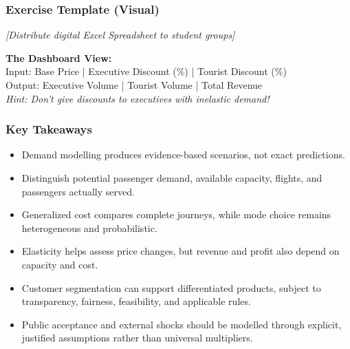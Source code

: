 \documentclass{beamer}
\begin{document}
\begin{frame}[t]
  \frametitle{Exercise Template (Visual)}
  
  \begin{center}
      \textit{[Distribute digital Excel Spreadsheet to student groups]}
      
      \vspace{0.5cm}
      
      \textbf{The Dashboard View:} \\
      \vspace{0.2cm}
      Input: Base Price | Executive Discount (\%) | Tourist Discount (\%) \\
      Output: Executive Volume | Tourist Volume | Total Revenue \\
      \vspace{0.5cm}
      \textit{Hint: Don't give discounts to executives with inelastic demand!}
  \end{center}
\end{frame}

\begin{frame}[t]
\frametitle{Key Takeaways}
\begin{itemize}
\item Demand modelling produces evidence-based scenarios, not exact predictions.
\item Distinguish potential passenger demand, available capacity, flights, and passengers actually served.
\item Generalized cost compares complete journeys, while mode choice remains heterogeneous and probabilistic.
\item Elasticity helps assess price changes, but revenue and profit also depend on capacity and cost.
\item Customer segmentation can support differentiated products, subject to transparency, fairness, feasibility, and applicable rules.
\item Public acceptance and external shocks should be modelled through explicit, justified assumptions rather than universal multipliers.
\end{itemize}
\end{frame}
\end{document}
